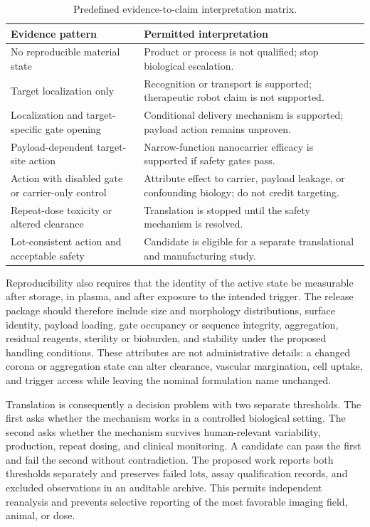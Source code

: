 \documentclass[conference]{IEEEtran}
\begin{document}
\begin{table}[t]
\caption{Predefined evidence-to-claim interpretation matrix.}
\label{tab:interpretation}
\centering
\footnotesize
\setlength{\tabcolsep}{1.5pt}
\begin{tabular}{p{}p{}}
\hline
Evidence pattern & Permitted interpretation \\
\hline
No reproducible material state & Product or process is not qualified; stop biological escalation. \\
Target localization only & Recognition or transport is supported; therapeutic robot claim is not supported. \\
Localization and target-specific gate opening & Conditional delivery mechanism is supported; payload action remains unproven. \\
Payload-dependent target-site action & Narrow-function nanocarrier efficacy is supported if safety gates pass. \\
Action with disabled gate or carrier-only control & Attribute effect to carrier, payload leakage, or confounding biology; do not credit targeting. \\
Repeat-dose toxicity or altered clearance & Translation is stopped until the safety mechanism is resolved. \\
Lot-consistent action and acceptable safety & Candidate is eligible for a separate translational and manufacturing study. \\
\hline
\end{tabular}
\end{table}

Reproducibility also requires that the identity of the active state be measurable after storage, in plasma, and after exposure to the intended trigger. The release package should therefore include size and morphology distributions, surface identity, payload loading, gate occupancy or sequence integrity, aggregation, residual reagents, sterility or bioburden, and stability under the proposed handling conditions. These attributes are not administrative details: a changed corona or aggregation state can alter clearance, vascular margination, cell uptake, and trigger access while leaving the nominal formulation name unchanged.

Translation is consequently a decision problem with two separate thresholds. The first asks whether the mechanism works in a controlled biological setting. The second asks whether the mechanism survives human-relevant variability, production, repeat dosing, and clinical monitoring. A candidate can pass the first and fail the second without contradiction. The proposed work reports both thresholds separately and preserves failed lots, assay qualification records, and excluded observations in an auditable archive. This permits independent reanalysis and prevents selective reporting of the most favorable imaging field, animal, or dose.
\end{document}

